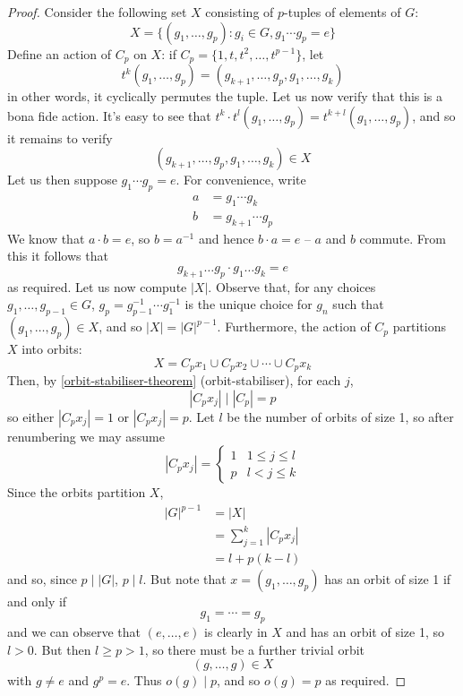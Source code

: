 \documentclass{../../template/note}
\begin{document}
    \begin{proof}
        Consider the following set \(X\) consisting of \(p\)-tuples of elements of \(G\):
        \[
            X = \{(g_1, \dots, g_p): g_i \in G, g_1 \cdots g_p = e\}
        \]
        Define an action of \(C_p\) on \(X\): if \(C_p = \{1, t, t^2, \dots, t^{p-1}\}\), let
        \[
            t^k(g_1, \dots, g_p) = (g_{k+1}, \dots, g_p, g_1, \dots, g_k)
        \]
        in other words, it cyclically permutes the tuple. Let us now verify that this is a bona fide action. It's easy to see that \(t^k \cdot t^l (g_1, \dots, g_p) = t^{k+l} (g_1, \dots, g_p)\), and so it remains to verify
        \[
            (g_{k+1}, \dots, g_p, g_1, \dots, g_k) \in X
        \]
        Let us then suppose \(g_1 \cdots g_p = e\). For convenience, write
        \begin{align*}
            a &= g_1 \cdots g_k \\
            b &= g_{k+1} \cdots g_p
        \end{align*}
        We know that \(a \cdot b = e\), so \(b = a^{-1}\) and hence \(b \cdot a = e\) -- \(a\) and \(b\) commute. From this it follows that
        \[
            g_{k+1} \dots g_p \cdot g_1 \dots g_k = e
        \]
        as required. Let us now compute \(|X|\). Observe that, for any choices \(g_1, \dots, g_{p-1} \in G\), \(g_p = g_{p-1}^{-1} \cdots g_1^{-1}\) is the unique choice for \(g_n\) such that \((g_1, \dots, g_p) \in X\), and so \(|X| = |G|^{p-1}\). Furthermore, the action of \(C_p\) partitions \(X\) into orbits:
        \[
            X = C_p x_1 \cup C_p x_2 \cup \cdots \cup C_p x_k
        \]
        Then, by \cref{orbit-stabiliser-theorem} (orbit-stabiliser), for each \(j\),
        \[
            |C_p x_j| \;\big\vert\; |C_p| = p
        \] 
        so either \(|C_p x_j| = 1\) or \(|C_p x_j| = p\). Let \(l\) be the number of orbits of size 1, so after renumbering we may assume
        \[
            |C_p x_j| =
            \begin{cases}
                1 & 1 \leq j \leq l \\
                p & l < j \leq k
            \end{cases}
        \]
        Since the orbits partition \(X\),
        \begin{align*}
            |G|^{p-1} &= |X| \\
            &= \sum_{j=1}^k |C_px_j| \\
            &= l + p(k-l)
        \end{align*}
        and so, since \(p \mid |G|\), \(p \mid l\). But note that \(x = (g_1, \dots, g_p)\) has an orbit of size 1 if and only if
        \[
            g_1 = \cdots = g_p
        \]
        and we can observe that \((e, \dots, e)\) is clearly in \(X\) and has an orbit of size 1, so \(l > 0\). But then \(l \geq p > 1\), so there must be a further trivial orbit
        \[
            (g, \dots, g) \in X
        \]
        with \(g \neq e\) and \(g^p = e\). Thus \(o(g) \mid p\), and so \(o(g) = p\) as required.
        
    \end{proof}
\end{document}

